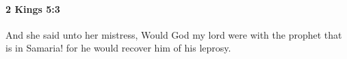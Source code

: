 
		\paragraph{2 Kings 5:3} %
			\label{2KINGS-5-3}

			And she said unto her mistress, Would God my lord were with the prophet that is in Samaria! for he would recover him of his leprosy.


